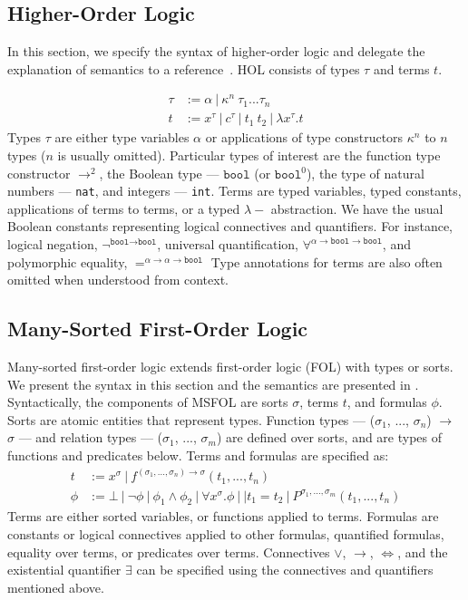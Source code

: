 \documentclass{article}
\begin{document}
	\subsection{Higher-Order Logic}
	\label{sec:hol}
	In this section, we specify the 
	syntax of higher-order logic 
	and delegate the explanation of 
	semantics to a 
	reference~\cite{10.5555/155278}. 
	HOL consists of 
	types $\tau$ and terms $t$. 
	
	\begin{align*}
	\tau &:= \alpha\ |\ \kappa^n\ 
	\tau_1 ... \tau_n\\
	t &:= x^{\tau}\ |\ c^{\tau}\ |\ t_1\ t_2\ |\ 
	\lambda x^{\tau}.t
	\end{align*}	
	Types $\tau$ are either type
	variables $\alpha$ or 
	applications of type 
	constructors $\kappa^n$ to 
	$n$ types ($n$ is usually omitted). 
	Particular types of interest are 
	the function type constructor 
	$\to^{2}$, the Boolean type 
	--- $\texttt{bool}$ (or 
	$\texttt{bool}^0$), the type of 
	natural numbers --- \texttt{nat},
	and integers --- \texttt{int}.
	Terms are typed variables, 
	typed constants, applications 
	of terms to terms, or a typed
	$\lambda-$ abstraction. We have
	the usual Boolean constants 
	representing logical connectives
	and quantifiers. For instance, 
	logical negation, 
	$\neg^{\texttt{bool} \to 
	\texttt{bool}}$, universal 
	quantification,
	$\forall^{\alpha \to 
	\texttt{bool} \to \texttt{bool}}$, 
	and polymorphic equality,
	$=^{\alpha \to \alpha 
	\to \texttt{bool}}$ Type 
	annotations for terms are also 
	often omitted when understood
	from context.

	\subsection{Many-Sorted First-Order Logic}
	\label{sec:msfol}
	Many-sorted first-order logic extends
	first-order logic (FOL) with 
	types or sorts. We present the 
	syntax in this section and the 
	semantics are presented in
	\cite{Barrett2018}. Syntactically, 
	the components of MSFOL are sorts 
	$\sigma$, terms $t$, and 
	formulas $\phi$. Sorts are 
	atomic entities that 
	represent types. Function types 
	--- ($\sigma_1$, ..., $\sigma_n$) 
	$\to$ $\sigma$ ---
	and relation types 
	--- ($\sigma_1$, ..., $\sigma_m$)
	are defined over sorts, and 
	are types of functions and 
	predicates below. Terms and 
	formulas are specified as:
	\begin{align*}
		t &:= x^{\sigma}\ |\ 
		f^{(\sigma_1, ..., \sigma_n) \to 
		\sigma}	(t_1, ..., t_n)\\
		\phi &:= \bot\ |\ \neg \phi\ |\ 
		\phi_1 \land \phi_2\ |\ \forall 
		x^{\sigma} . \phi\ |\ | t_1 = t_2
		\ |\ P^{\sigma_1,...,\sigma_m}
		(t_1, ..., t_n)
	\end{align*}
	Terms are either sorted variables, 
	or functions applied to terms.
	Formulas are constants or logical 
	connectives applied to other 
	formulas, quantified formulas, 
	equality over terms, or predicates 
	over terms. Connectives $\lor$, 
	$\to$, $\iff$, and the existential
	quantifier $\exists$ can be 
	specified using the connectives 
	and quantifiers mentioned above.
	
\end{document}

